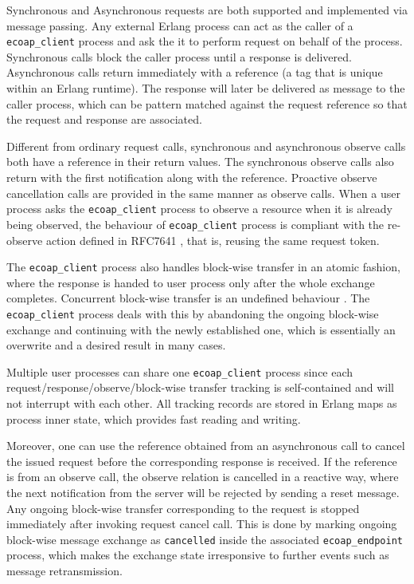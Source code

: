 Synchronous and Asynchronous requests are both supported and implemented via message passing. Any external Erlang process can act as the caller of a \verb|ecoap_client| process and ask the it to perform request on behalf of the process. Synchronous calls block the caller process until a response is delivered. Asynchronous calls return immediately with a reference (a tag that is unique within an Erlang runtime). The response will later be delivered as message to the caller process, which can be pattern matched against the request reference so that the request and response are associated. 

Different from ordinary request calls, synchronous and asynchronous observe calls both have a reference in their return values. The synchronous observe calls also return with the first notification along with the reference. Proactive observe cancellation calls are provided in the same manner as observe calls. When a user process asks the \verb|ecoap_client| process to observe a resource when it is already being observed, the behaviour of \verb|ecoap_client| process is compliant with the re-observe action defined in RFC7641 \cite{coap_observe}, that is, reusing the same request token.

The \verb|ecoap_client| process also handles block-wise transfer in an atomic fashion, where the response is handed to user process only after the whole exchange completes. Concurrent block-wise transfer is an undefined behaviour \cite{blockwise}. The \verb|ecoap_client| process deals with this by abandoning the ongoing block-wise exchange and continuing with the newly established one, which is essentially an overwrite and a desired result in many cases.

Multiple user processes can share one \verb|ecoap_client| process since each request/response/observe/block-wise transfer tracking is self-contained and will not interrupt with each other. All tracking records are stored in Erlang maps as process inner state, which provides fast reading and writing.

Moreover, one can use the reference obtained from an asynchronous call to cancel the issued request before the corresponding response is received. If the reference is from an observe call, the observe relation is cancelled in a reactive way, where the next notification from the server will be rejected by sending a reset message. Any ongoing block-wise transfer corresponding to the request is stopped immediately after invoking request cancel call. This is done by marking ongoing block-wise message exchange as \verb|cancelled| inside the associated \verb|ecoap_endpoint| process, which makes the exchange state irresponsive to further events such as message retransmission. 

